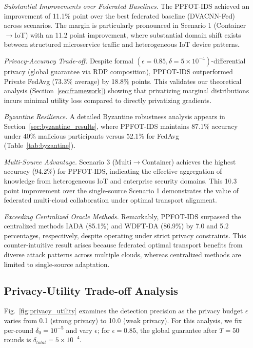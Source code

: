 \documentclass{ieeeaccess}
\theoremstyle{plain}
\theoremstyle{definition}
\theoremstyle{remark}
\begin{document}
\textit{Substantial Improvements over Federated Baselines.} The PPFOT-IDS achieved an improvement of 11.1\% point over the best federated baseline (DVACNN-Fed) across scenarios. The margin is particularly pronounced in Scenario 1 (Container$\to$IoT) with an 11.2 point improvement, where substantial domain shift exists between structured microservice traffic and heterogeneous IoT device patterns.

\textit{Privacy-Accuracy Trade-off.} Despite formal $(\epsilon = 0.85, \delta = 5 \times 10^{-4})$-differential privacy (global guarantee via RDP composition), PPFOT-IDS outperformed Private FedAvg (73.3\% average) by 18.8\% points. This validates our theoretical analysis (Section~\ref{sec:framework}) showing that privatizing marginal distributions incurs minimal utility loss compared to directly privatizing gradients.

\textit{Byzantine Resilience.} A detailed Byzantine robustness analysis appears in Section~\ref{sec:byzantine_results}, where PPFOT-IDS maintains 87.1\% accuracy under 40\% malicious participants versus 52.1\% for FedAvg (Table~\ref{tab:byzantine}).

\textit{Multi-Source Advantage.} Scenario 3 (Multi$\to$Container) achieves the highest accuracy (94.2\%) for PPFOT-IDS, indicating the effective aggregation of knowledge from heterogeneous IoT and enterprise security domains. This 10.3 point improvement over the single-source Scenario 1 demonstrates the value of federated multi-cloud collaboration under optimal transport alignment.

\textit{Exceeding Centralized Oracle Methods.} Remarkably, PPFOT-IDS surpassed the centralized methods IADA (85.1\%) and WDFT-DA (86.9\%) by 7.0 and 5.2 percentages, respectively, despite operating under strict privacy constraints. This counter-intuitive result arises because federated optimal transport benefits from diverse attack patterns across multiple clouds, whereas centralized methods are limited to single-source adaptation. 

\subsection{Privacy-Utility Trade-off Analysis}

Fig.~\ref{fig:privacy_utility} examines the detection precision as the privacy budget $\epsilon$ varies from 0.1 (strong privacy) to 10.0 (weak privacy). For this analysis, we fix per-round $\delta_0 = 10^{-5}$ and vary $\epsilon$; for $\epsilon = 0.85$, the global guarantee after $T = 50$ rounds is $\delta_{total} = 5 \times 10^{-4}$.
\end{document}
